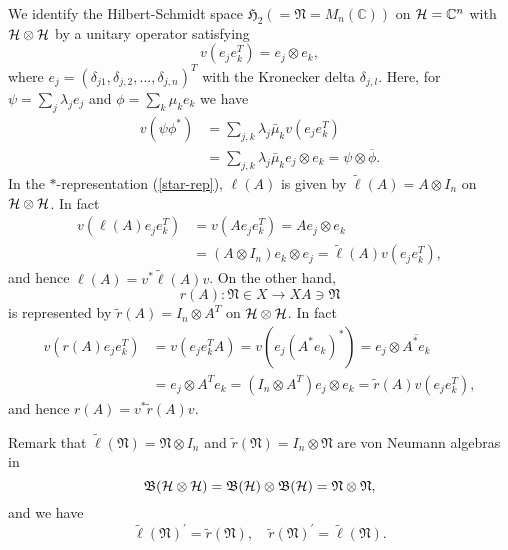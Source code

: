 \documentclass{article}
\begin{document}
 We identify the Hilbert-Schmidt space $\mathfrak{H}_2(=\mathfrak{N}=M_n(\mathbb{C}))$ on ${\cal H}=\mathbb{C}^n$ with $\cal{H}\otimes\cal{H}$
by a unitary operator satisfying 
$$
v(e_je_k^T)=e_j\otimes e_k,
$$
where $e_j=(\delta_{j1},\delta_{j,2},...,\delta_{j,n})^T$ with the Kronecker delta $\delta_{j,l}$. 
Here, for $\psi=\sum_j \lambda_j e_j$ and $\phi=\sum_k \mu_k e_k$
we have
\begin{equation}
\begin{split}
v(\psi\phi^\ast)&=\sum_{j,k}\lambda_j\bar{\mu}_k v(e_je_k^T)\\
&=\sum_{j,k}\lambda_j\bar{\mu}_k e_j\otimes e_k={\psi}\otimes \overline{\phi}.
\end{split}
\end{equation}
In the $\ast$-representation (\ref{star-rep}), $\ell(A)$ is given by $\tilde{\ell}(A)=A\otimes I_n$ on $\cal{H}\otimes\cal{H}$.
In fact
 \begin{equation}
 \begin{split}
 v(\ell(A)e_je_k^T)&=v(Ae_je_k^T)=Ae_j\otimes e_k\\
 &= (A\otimes I_n)e_k\otimes  e_j=\tilde{\ell}(A)v(e_je_k^T),
 \end{split} 
 \end{equation}
 and hence $\ell(A)=v^{\ast}\tilde{\ell}(A)v$. 
On the other hand, 
$$
r(A):\mathfrak{N}\in X \to XA\ni\mathfrak{N}
$$ 
is represented by $\tilde{r}(A)=I_n\otimes A^T$ on $\cal{H}\otimes\cal{H}$.
In fact
 \begin{equation}
 \begin{split}
 v(r(A)e_je_k^T)&=v(e_je_k^TA)=v(e_j(A^\ast e_k)^\ast)=e_j\otimes \overline{A^\ast e_k}\\
 &= e_j \otimes A^T e_k= (I_n\otimes A^T)e_j\otimes  e_k=\tilde{r}(A)v(e_je_k^T),
 \end{split} 
 \end{equation}
 and hence $r(A)=v^{\ast}\tilde{r}(A) v$. 

Remark that $\tilde{\ell}(\mathfrak{N})=\mathfrak{N}\otimes I_n$ and $\tilde{r}(\mathfrak{N})=I_n\otimes \mathfrak{N}$ are von Neumann algebras in 
$$\mathfrak{B}({\cal H}\otimes{\cal H})=\mathfrak{B}({\cal H})\otimes \mathfrak{B}({\cal H})=\mathfrak{N}\otimes \mathfrak{N},
$$
and we have 
\begin{equation}\label{lr}
\tilde{\ell}(\mathfrak{N})^\prime=\tilde{r}({\mathfrak{N}}),\quad
\tilde{r}(\mathfrak{N})^\prime=\tilde{\ell}(\mathfrak{N}).
\end{equation}
\end{document}
